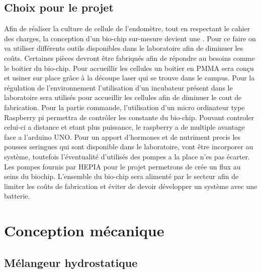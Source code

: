 \documentclass[a4paper, 11pt]{article}
\begin{document}
\subsection{Choix pour le projet}
Afin de réaliser la culture de cellule de l'endomètre, tout en respectant le cahier 
des charges, la conception d'un bio-chip sur-mesure devient une . Pour ce faire on va utiliser différents 
outils disponibles dans le laboratoire afin de diminuer les coûts. Certaines pièces devront être
fabriqués afin de répondre au besoins comme le boitier du bio-chip.
Pour accueillir les cellules un boitier en PMMA sera conçu et usiner sur 
place grâce à la découpe laser qui se trouve dans le campus.
Pour la régulation de l'environnement l'utilisation d'un incubateur présent dans le laboratoire sera 
utilisés pour accueillir les cellules afin de diminuer le cout de fabrication.
Pour la partie commande, l'utilisation d'un micro ordinateur type Raspberry pi permettra de contrôler 
les constante du bio-chip. Pouvant controler celui-ci a distance et etant plus puissance, le raspberry a 
de multiple avantage face a l'arduino UNO.
Pour un apport d'hormones et de nutriment precis les pousses seringues qui sont disponible 
dans le laboratoire, vont être incorporer au système, toutefois l'éventualité d'utilisés des pompes a la 
place n'es pas écarter.
Les pompes fournis par HEPIA pour le projet permetrons de crée un flux au seins du biochip.
L'ensemble du bio-chip sera alimenté par le secteur afin de limiter les coûts de fabrication et éviter 
de devoir développer un système avec une batterie.

\newpage
\section{Conception mécanique}
\subsection{Mélangeur hydrostatique}
\end{document}
